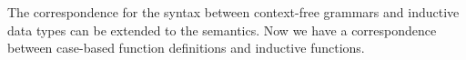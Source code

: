 The correspondence for the syntax between context-free grammars and inductive data types can be extended to the semantics.
Now we have a correspondence between case-based function definitions and inductive functions.



